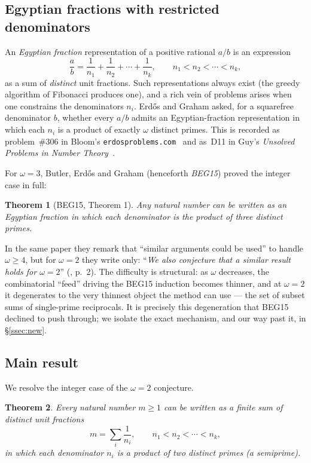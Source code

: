 \documentclass[11pt]{amsart}
\theoremstyle{plain}
\newtheorem{theorem}{Theorem}[section]
\theoremstyle{definition}
\begin{document}
\subsection{Egyptian fractions with restricted denominators}
An \emph{Egyptian fraction} representation of a positive rational $a/b$ is an
expression
\[
\frac{a}{b}=\frac{1}{n_1}+\frac{1}{n_2}+\cdots+\frac{1}{n_k},
\qquad n_1<n_2<\cdots<n_k,
\]
as a sum of \emph{distinct} unit fractions.  Such representations always exist
(the greedy algorithm of Fibonacci produces one), and a rich vein of problems
arises when one constrains the denominators $n_i$.  Erd\H{o}s and Graham
\cite{ErdosGraham1980} asked, for a squarefree denominator $b$, whether every
$a/b$ admits an Egyptian-fraction representation in which each $n_i$ is a product
of exactly $\omega$ distinct primes.  This is recorded as
problem~\#306 in Bloom's \texttt{erdosproblems.com}~\cite{Bloom306} and as~D11 in
Guy's \emph{Unsolved Problems in Number Theory}~\cite{Guy}.

For $\omega=3$, Butler, Erd\H{o}s and Graham \cite{BEG2015} (henceforth
\emph{BEG15}) proved the integer case in full:

\begin{theorem}[BEG15, Theorem 1]
Any natural number can be written as an Egyptian fraction in which each
denominator is the product of three distinct primes.
\end{theorem}

In the same paper they remark that ``similar arguments could be used'' to handle
$\omega\ge 4$, but for $\omega=2$ they write only: ``\emph{We also conjecture
that a similar result holds for $\omega=2$}'' (\cite{BEG2015}, p.~2).  The
difficulty is structural: as $\omega$ decreases, the combinatorial ``feed''
driving the BEG15 induction becomes thinner, and at $\omega=2$ it degenerates to
the very thinnest object the method can use --- the set of subset sums of
single-prime reciprocals.  It is precisely this degeneration that BEG15 declined
to push through; we isolate the exact mechanism, and our way past it, in
\S\ref{ssec:new}.

\subsection{Main result}
We resolve the integer case of the $\omega=2$ conjecture.

\begin{theorem}\label{thm:main}
Every natural number $m\ge 1$ can be written as a finite sum of distinct unit
fractions
\[
m=\sum_{i}\frac{1}{n_i},\qquad n_1<n_2<\cdots<n_k,
\]
in which each denominator $n_i$ is a product of two distinct primes (a
semiprime).
\end{theorem}
\end{document}
